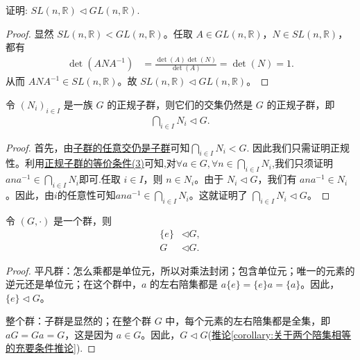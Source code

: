 \documentclass[../../main.tex]{subfiles}
\begin{document}
\begin{example}
证明: \(SL(n, \mathbb{R}) \lhd GL(n, \mathbb{R})\).
\end{example}
\begin{proof}
显然 \(SL(n, \mathbb{R}) < GL(n, \mathbb{R})\)。任取 \(A \in GL(n, \mathbb{R})\)，\(N \in SL(n, \mathbb{R})\)，都有
\begin{align*}
\det(ANA^{-1}) &= \frac{\det(A)\det(N)}{\det(A)} = \det(N) = 1.
\end{align*}
从而 \(ANA^{-1} \in SL(n, \mathbb{R})\)。故 \(SL(n, \mathbb{R}) \lhd GL(n, \mathbb{R})\)。 
\end{proof}

\begin{proposition}[正规子群的任意交还是正规子群]\label{proposition:一族正规子群的任意交还是正规子群}
令 $(N_i)_{i\in I}$ 是一族 $G$ 的正规子群，则它们的交集仍然是 $G$ 的正规子群，即
\begin{align*}
\bigcap_{i\in I}N_i\lhd G .
\end{align*}
\end{proposition}
\begin{proof}
首先，由\hyperref[proposition:子群的任意交仍是子群]{子群的任意交仍是子群}可知$\bigcap_{i\in I}N_i< G .$
因此我们只需证明正规性。利用\hyperref[lemma:正规子群的等价条件]{正规子群的等价条件(3)}可知,对$\forall a\in G,\forall n\in \bigcap_{i\in I}N_i$,我们只须证明$ana^{-1}\in \bigcap_{i\in I}N_i$即可.任取 $i\in I$，则 $n\in N_i$。由于 $N_i\lhd G$，我们有 $ana^{-1}\in N_i$。因此，由$i$的任意性可知$ana^{-1}\in \bigcap_{i\in I}N_i$。这就证明了 $\bigcap_{i\in I}N_i\lhd G$。
\end{proof}

\begin{proposition}\label{proposition:平凡群和整个群都是正规子群}
令 $(G,\cdot)$ 是一个群，则
\begin{align*}
\{e\}&\lhd G ,\\
G&\lhd G .
\end{align*}
\end{proposition}
\begin{proof}
平凡群：怎么乘都是单位元，所以对乘法封闭；包含单位元；唯一的元素的逆元还是单位元；在这个群中，$a$ 的左右陪集都是 $a\{e\}=\{e\}a = \{a\}$。因此，$\{e\}\lhd G$。

整个群：子群是显然的；在整个群 $G$ 中，每个元素的左右陪集都是全集，即 $aG = Ga = G$，这是因为 $a\in G$。因此，$G\lhd G$(\hyperref[corollary:关于两个陪集相等的充要条件推论]{推论\ref{corollary:关于两个陪集相等的充要条件推论}}).
\end{proof}
\end{document}
